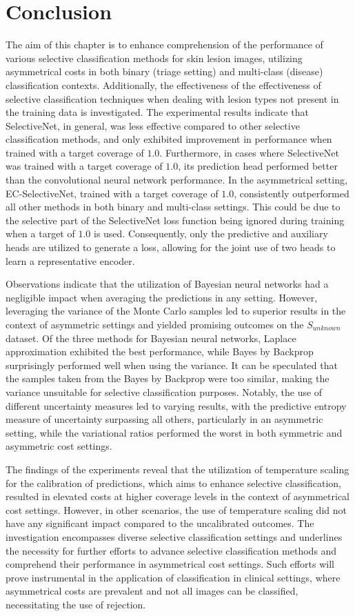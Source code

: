 \section{Conclusion}
\label{sec:selective_conclusion}
The aim of this chapter is to enhance comprehension of the performance of various selective classification methods for skin lesion images, utilizing asymmetrical costs in both binary (triage setting) and multi-class (disease) classification contexts. Additionally, the effectiveness of the effectiveness of selective classification techniques when dealing with lesion types not present in the training data is investigated. The experimental results indicate that SelectiveNet, in general, was less effective compared to other selective classification methods, and only exhibited improvement in performance when trained with a target coverage of $1.0$. Furthermore, in cases where SelectiveNet was trained with a target coverage of $1.0$, its prediction head performed better than the convolutional neural network performance. In the asymmetrical setting, EC-SelectiveNet, trained with a target coverage of $1.0$, consistently outperformed all other methods in both binary and multi-class settings. This could be due to the selective part of the SelectiveNet loss function being ignored during training when a target of $1.0$ is used. Consequently, only the predictive and auxiliary heads are utilized to generate a loss, allowing for the joint use of two heads to learn a representative encoder.

Observations indicate that the utilization of Bayesian neural networks had a negligible impact when averaging the predictions in any setting. However, leveraging the variance of the Monte Carlo samples led to superior results in the context of asymmetric settings and yielded promising outcomes on the $S_{unknown}$ dataset. Of the three methods for Bayesian neural networks, Laplace approximation exhibited the best performance, while Bayes by Backprop surprisingly performed well when using the variance. It can be speculated that the samples taken from the Bayes by Backprop were too similar, making the variance unsuitable for selective classification purposes. Notably, the use of different uncertainty measures led to varying results, with the predictive entropy measure of uncertainty surpassing all others, particularly in an asymmetric setting, while the variational ratios performed the worst in both symmetric and asymmetric cost settings.

The findings of the experiments reveal that the utilization of temperature scaling for the calibration of predictions, which aims to enhance selective classification, resulted in elevated costs at higher coverage levels in the context of asymmetrical cost settings. However, in other scenarios, the use of temperature scaling did not have any significant impact compared to the uncalibrated outcomes. The investigation encompasses diverse selective classification settings and underlines the necessity for further efforts to advance selective classification methods and comprehend their performance in asymmetrical cost settings. Such efforts will prove instrumental in the application of classification in clinical settings, where asymmetrical costs are prevalent and not all images can be classified, necessitating the use of rejection.